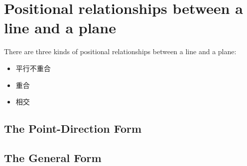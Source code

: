 \documentclass[onecolumn]{ctexart}
\begin{document}
\section{Positional relationships between a line and a plane}
There are three kinds of positional relationships between a line and a plane:
\begin{itemize}
  \item 平行不重合
  \item 重合
  \item 相交
\end{itemize}

\subsection{The Point-Direction Form}

\subsection{The General Form}
\end{document}
